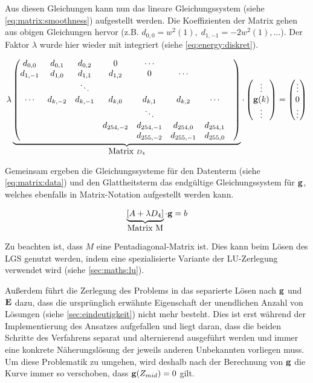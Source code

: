 Aus diesen Gleichungen kann nun das lineare Gleichungssystem (siehe \autoref{eq:matrix:smoothness}) aufgestellt werden. Die  Koeffizienten der Matrix gehen aus obigen Gleichungen hervor (z.B. $d_{0,0} = w^2(1), \; d_{1,-1} = -2w^2(1), \dots$). Der Faktor $\lambda$ wurde hier wieder mit integriert (siehe \autoref{eq:energy:diskret}).

\begin{align}
\label{eq:matrix:smoothness}
\lambda
\underbrace{
\begin{pmatrix}
d_{0,0} & d_{0,1} & d_{0,2} & 0 &\cdots\\
d_{1,-1} & d_{1,0} & d_{1,1} & d_{1,2} & 0 &\cdots\\
&  & \ddots &  \\
\cdots  & d_{k,-2} & d_{k,-1} & d_{k,0}&d_{k,1} &d_{k,2} & \cdots\\
&&&&\ddots&&&\\
&&&d_{254,-2}&d_{254,-1}&d_{254,0}&d_{254,1}\\
&&&&d_{255,-2}&d_{255,-1}&d_{255,0}\\
\end{pmatrix}}_{\mbox{Matrix } D_4}
\cdot
\begin{pmatrix}
\vdots\\
\mathbf g(k)\\
\vdots
\end{pmatrix}
= 
\begin{pmatrix}
\vdots\\
0\\
\vdots
\end{pmatrix}
\end{align}


Gemeinsam ergeben die Gleichungssysteme für den Datenterm (siehe \autoref{eq:matrix:data}) und den Glattheitsterm das endgültige Gleichungssystem für $\mathbf g$, welches ebenfalls in Matrix-Notation aufgestellt werden kann.
 
\begin{align}
\label{eq:g:lgs}
\underbrace{[A+\lambda D_4]}_{\mbox{Matrix M}}\cdot \mathbf g = b
\end{align}

Zu beachten ist, dass $M$ eine \gls{Pentadiagonal-Matrix} ist. Dies kann beim Lösen des \gls{LGS} genutzt werden, indem eine spezialisierte Variante der LU-Zerlegung verwendet wird (siehe \autoref{sec:maths:lu}).

Außerdem führt die Zerlegung des Problems in das separierte Lösen nach $\mathbf g$ und $\mathbf E$ dazu, dass die ursprünglich erwähnte Eigenschaft der unendlichen Anzahl von Lösungen (siehe \autoref{sec:eindeutigkeit}) nicht mehr besteht. Dies ist erst während der Implementierung des Ansatzes aufgefallen und liegt daran, dass die beiden Schritte des Verfahrens separat und alternierend ausgeführt werden und immer eine konkrete Näherungslösung der jeweils anderen Unbekannten vorliegen muss.
Um diese Problematik zu umgehen, wird deshalb nach der Berechnung von $\mathbf g$ die Kurve immer so verschoben, dass $\mathbf g(Z_{mid}) = 0$ gilt. 

